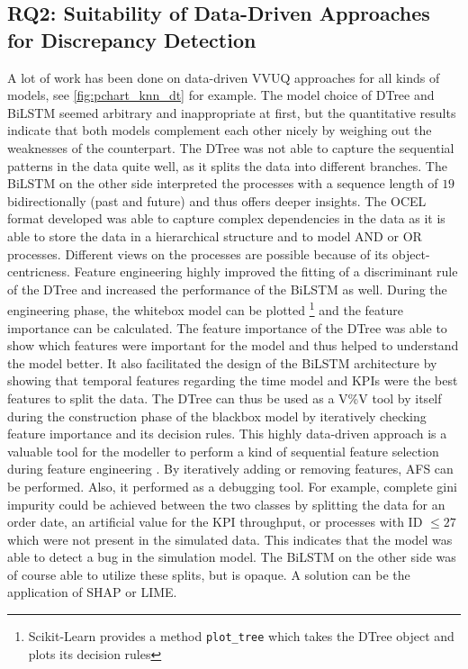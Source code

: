 \subsection{RQ2: Suitability of Data-Driven Approaches for Discrepancy Detection}
\label{sec:discussion_rq2}
A lot of work has been done on data-driven VVUQ approaches for all kinds of models, see \autoref{fig:pchart_knn_dt} for example. The model choice of DTree and BiLSTM seemed arbitrary and inappropriate at first, but the quantitative results indicate that both models complement each other nicely by weighing out the weaknesses of the counterpart. The DTree was not able to capture the sequential patterns in the data quite well, as it splits the data into different branches. The BiLSTM on the other side interpreted the processes with a sequence length of $19$ bidirectionally (past and future) and thus offers deeper insights. The OCEL format developed was able to capture complex dependencies in the data as it is able to store the data in a hierarchical structure and to model AND or OR processes. Different views on the processes are possible because of its object-centricness. Feature engineering highly improved the fitting of a discriminant rule of the DTree and increased the performance of the BiLSTM as well. During the engineering phase, the whitebox model can be plotted \footnote{Scikit-Learn provides a method \texttt{plot\_tree} which takes the DTree object and plots its decision rules} and the feature importance can be calculated. The feature importance of the DTree was able to show which features were important for the model and thus helped to understand the model better. It also facilitated the design of the BiLSTM architecture by showing that temporal features regarding the time model and KPIs were the best features to split the data. The DTree can thus be used as a V\%V tool by itself during the construction phase of the blackbox model by iteratively checking feature importance and its decision rules. This highly data-driven approach is a valuable tool for the modeller to perform a kind of sequential feature selection during feature engineering \autocite{pudil1994floating}. By iteratively adding or removing features, AFS can be performed. Also, it performed as a debugging tool. For example, complete gini impurity could be achieved between the two classes by splitting the data for an order date, an artificial value for the KPI throughput, or processes with ID $\le 27$ which were not present in the simulated data. This indicates that the model was able to detect a bug in the simulation model. The BiLSTM on the other side was of course able to utilize these splits, but is opaque. A solution can be the application of SHAP or LIME.

